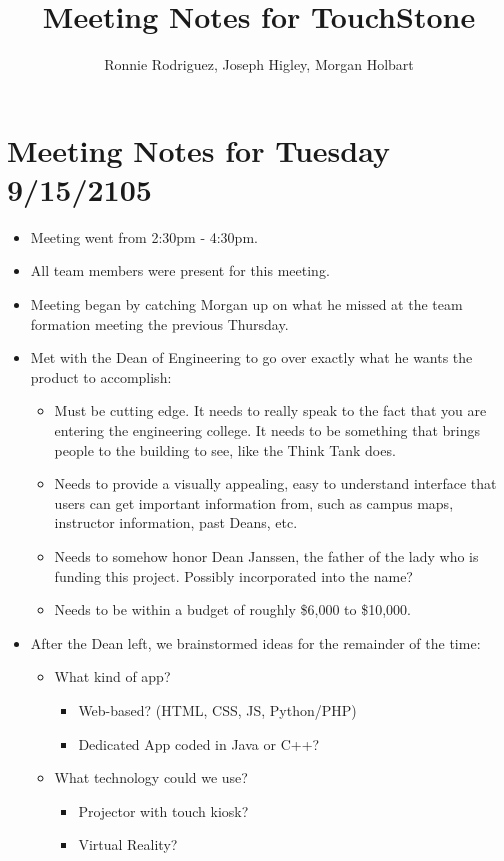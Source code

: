 \documentclass[]{article}
\title{Meeting Notes for TouchStone}
\author{Ronnie Rodriguez, Joseph Higley, Morgan Holbart}
\begin{document}
\maketitle

\section{Meeting Notes for Tuesday 9/15/2105}
\begin{itemize}
	\item Meeting went from 2:30pm - 4:30pm.
	\item All team members were present for this meeting.
		\item Meeting began by catching Morgan up on what he missed at the team formation meeting the previous Thursday.
		\item Met with the Dean of Engineering to go over exactly what he wants the product to accomplish:
			\begin{itemize}
				\item Must be cutting edge. It needs to really speak to the fact that you are entering the engineering college. It needs to be something that brings people to the building to see, like the Think Tank does.
				\item  Needs to provide a visually appealing, easy to understand interface that users can get important information from, such as campus maps, instructor information, past Deans, etc.
				\item Needs to somehow honor Dean Janssen, the father of the lady who is funding this project. Possibly incorporated into the name?
				\item Needs to be within a budget of roughly \$6,000 to \$10,000.
			\end{itemize}
		\item After the Dean left, we brainstormed ideas for the remainder of the time:
			\begin{itemize}
				\item What kind of app?
					\begin{itemize}
						\item Web-based? (HTML, CSS, JS, Python/PHP)
						\item Dedicated App coded in Java or C++?
					\end{itemize}
				\item What technology could we use?
					\begin{itemize}
						\item Projector with touch kiosk?
						\item Virtual Reality?

\end{itemize}
\end{itemize}
\end{itemize}
\end{document}
